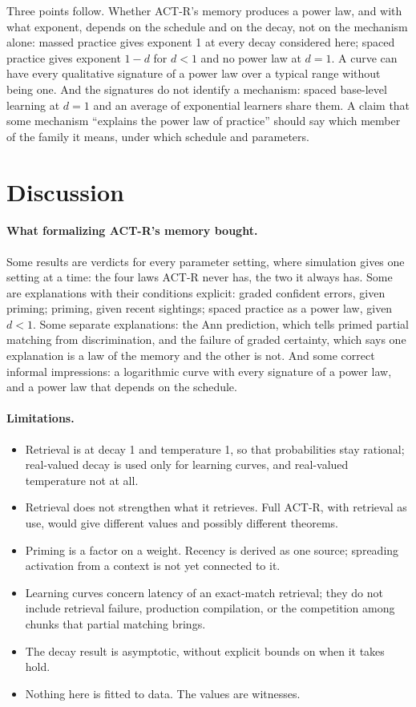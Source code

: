 \documentclass[11pt]{article}
\begin{document}
Three points follow. Whether ACT-R's memory produces a power law, and with what exponent, depends on the schedule and on the decay, not on the mechanism alone: massed practice gives exponent 1 at every decay considered here; spaced practice gives exponent $1-d$ for $d < 1$ and no power law at $d = 1$. A curve can have every qualitative signature of a power law over a typical range without being one. And the signatures do not identify a mechanism: spaced base-level learning at $d = 1$ and an average of exponential learners share them. A claim that some mechanism ``explains the power law of practice'' should say which member of the family it means, under which schedule and parameters.

\section{Discussion}

\paragraph{What formalizing ACT-R's memory bought.} Some results are verdicts for every parameter setting, where simulation gives one setting at a time: the four laws ACT-R never has, the two it always has. Some are explanations with their conditions explicit: graded confident errors, given priming; priming, given recent sightings; spaced practice as a power law, given $d<1$. Some separate explanations: the Ann prediction, which tells primed partial matching from discrimination, and the failure of graded certainty, which says one explanation is a law of the memory and the other is not. And some correct informal impressions: a logarithmic curve with every signature of a power law, and a power law that depends on the schedule.

\paragraph{Limitations.}
\begin{itemize}
  \item Retrieval is at decay 1 and temperature 1, so that probabilities stay rational; real-valued decay is used only for learning curves, and real-valued temperature not at all.
  \item Retrieval does not strengthen what it retrieves. Full ACT-R, with retrieval as use, would give different values and possibly different theorems.
  \item Priming is a factor on a weight. Recency is derived as one source; spreading activation from a context is not yet connected to it.
  \item Learning curves concern latency of an exact-match retrieval; they do not include retrieval failure, production compilation, or the competition among chunks that partial matching brings.
  \item The decay result is asymptotic, without explicit bounds on when it takes hold.
  \item Nothing here is fitted to data. The values are witnesses.
\end{itemize}
\end{document}
